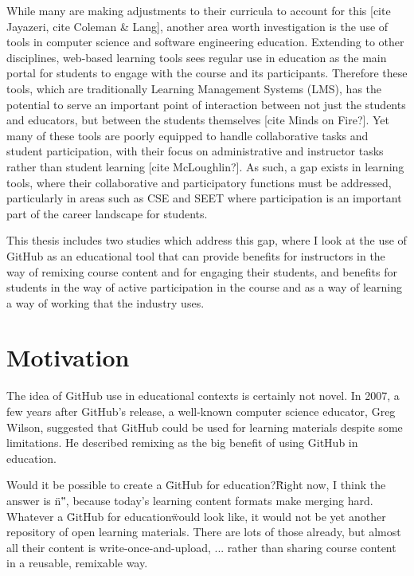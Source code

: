 While many are making adjustments to their curricula to account for this [cite Jayazeri, cite Coleman \& Lang], another area worth investigation is the use of tools in computer science and software engineering education. Extending to other disciplines, web-based learning tools sees regular use in education as the main portal for students to engage with the course and its participants. Therefore these tools, which are traditionally Learning Management Systems (LMS), has the potential to serve an important point of interaction between not just the students and educators, but between the students themselves [cite Minds on Fire?]. Yet many of these tools are poorly equipped to handle collaborative tasks and student participation, with their focus on administrative and instructor tasks rather than student learning [cite McLoughlin?]. As such, a gap exists in learning tools, where their collaborative and participatory functions must be addressed, particularly in areas such as CSE and SEET where participation is an important part of the career landscape for students.

This thesis includes two studies which address this gap, where I look at the use of GitHub as an educational tool that can provide benefits for instructors in the way of remixing course content and for engaging their students, and benefits for students in the way of active participation in the course and as a way of learning a way of working that the industry uses. %

\section{Motivation}
The idea of GitHub use in educational contexts is certainly not novel. In 2007, a few years after GitHub's release, a well-known computer science educator, Greg Wilson, suggested that GitHub could be used for learning materials despite some limitations. He described remixing as the big benefit of using GitHub in education.

Would it be possible to create a \"GitHub for education?\" Right now, I think the answer is \"n\"”, because today's learning content formats make merging hard. Whatever a \"GitHub for education\" would look like, it would not be yet another repository of open learning materials. There are lots of those already, but almost all their content is write-once-and-upload, ... rather than sharing course content in a reusable, remixable way.

